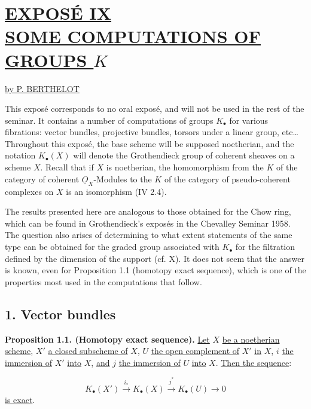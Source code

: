 %
\section*{\underline{EXPOSÉ IX}\\[3pt] \underline{\underline{SOME COMPUTATIONS OF GROUPS $K$}}}
\begin{center}
\underline{by P. BERTHELOT}
\end{center}

This exposé corresponds to no oral exposé, and will not be used in the rest of the seminar. It contains a number of computations of groups $K_\bullet$ for various fibrations: vector bundles, projective bundles, torsors under a linear group, etc\ldots{} Throughout this exposé, the base scheme will be supposed noetherian, and the notation $K_\bullet(X)$ will denote the Grothendieck group of coherent sheaves on a scheme $X$. Recall that if $X$ is noetherian, the homomorphism from the $K$ of the category of coherent $\underline{O}_X$-Modules to the $K$ of the category of pseudo-coherent complexes on $X$ is an isomorphism (IV 2.4).

The results presented here are analogous to those obtained for the Chow ring, which can be found in Grothendieck's exposés in the Chevalley Seminar 1958. The question also arises of determining to what extent statements of the same type can be obtained for the graded group associated with $K_\bullet$ for the filtration defined by the dimension of the support (cf. X). It does not seem that the answer is known, even for Proposition 1.1 (homotopy exact sequence), which is one of the properties most used in the computations that follow.

\subsection*{1. Vector bundles}

\textbf{Proposition 1.1. (Homotopy exact sequence).} \uline{Let} $X$ \uline{be a noetherian scheme}, $X'$ \uline{a closed subscheme of} $X$, $U$ \uline{the open complement of} $X'$ \uline{in} $X$, $i$ \uline{the immersion of} $X'$ \uline{into} $X$, \uline{and} $j$ \uline{the immersion of} $U$ \uline{into} $X$. \uline{Then the sequence}:

%
\[
K_\bullet(X')\xrightarrow{i_*}K_\bullet(X)\xrightarrow{j^*}K_\bullet(U)\longrightarrow 0
\]
\uline{is
exact}.

